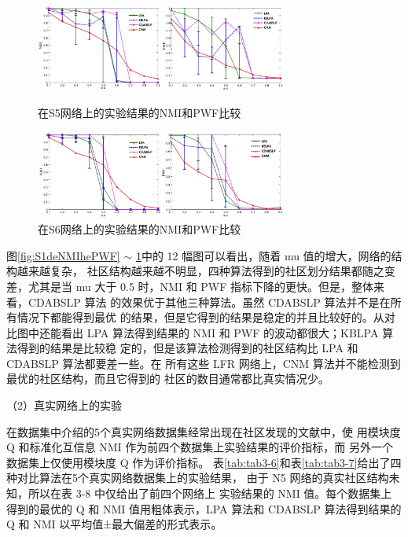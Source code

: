 \begin{figure}
  \centering
  \includegraphics[width=0.75\textwidth]{figures/S5deNMIhePWF}
  \caption{在S5网络上的实验结果的NMI和PWF比较}\label{fig:S5deNMIhePWF}

  \includegraphics[width=0.75\textwidth]{figures/S6deNMIhePWF}
  \caption{在S6网络上的实验结果的NMI和PWF比较}\label{fig:S6deNMIhePWF}
\end{figure}

图\ref{fig:S1deNMIhePWF} $\sim$ \ref{fig:S6deNMIhePWF}中的 12 幅图可以看出，随着 mu 值的增大，网络的结构越来越复杂，
社区结构越来越不明显，四种算法得到的社区划分结果都随之变差，尤其是当
mu 大于 0.5 时，NMI 和 PWF 指标下降的更快。但是，整体来看，CDABSLP 算法
的效果优于其他三种算法。虽然 CDABSLP 算法并不是在所有情况下都能得到最优
的结果，但是它得到的结果是稳定的并且比较好的。从对比图中还能看出 LPA
算法得到结果的 NMI 和 PWF 的波动都很大；KBLPA 算法得到的结果是比较稳
定的，但是该算法检测得到的社区结构比 LPA 和 CDABSLP 算法都要差一些。在
所有这些 LFR 网络上，CNM 算法并不能检测到最优的社区结构，而且它得到的
社区的数目通常都比真实情况少。 

（2）真实网络上的实验

在数据集中介绍的5个真实网络数据集经常出现在社区发现的文献中，使
用模块度 Q 和标准化互信息 NMI 作为前四个数据集上实验结果的评价指标，而
另外一个数据集上仅使用模块度 Q 作为评价指标。 
表\ref{tab:tab3-6}和表\ref{tab:tab3-7}给出了四种对比算法在5个真实网络数据集上的实验结果，
由于 N5 网络的真实社区结构未知，所以在表 3-8 中仅给出了前四个网络上
实验结果的 NMI 值。每个数据集上得到的最优的 Q 和 NMI 值用粗体表示，LPA
算法和 CDABSLP 算法得到结果的 Q 和 NMI 以平均值±最大偏差的形式表示。

